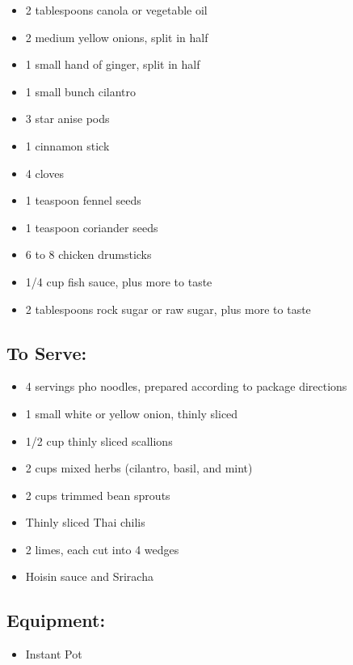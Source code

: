 \documentclass[
]{article}
\providecommand{\tightlist}{%
  \setlength{\itemsep}{0pt}\setlength{\parskip}{0pt}}
\begin{document}
\begin{itemize}
\tightlist
\item
  2 tablespoons canola or vegetable oil
\item
  2 medium yellow onions, split in half
\item
  1 small hand of ginger, split in half
\item
  1 small bunch cilantro
\item
  3 star anise pods
\item
  1 cinnamon stick
\item
  4 cloves
\item
  1 teaspoon fennel seeds
\item
  1 teaspoon coriander seeds
\item
  6 to 8 chicken drumsticks
\item
  1/4 cup fish sauce, plus more to taste
\item
  2 tablespoons rock sugar or raw sugar, plus more to taste
\end{itemize}

\hypertarget{to-serve}{%
\subsection{To Serve:}\label{to-serve}}

\begin{itemize}
\tightlist
\item
  4 servings pho noodles, prepared according to package directions
\item
  1 small white or yellow onion, thinly sliced
\item
  1/2 cup thinly sliced scallions
\item
  2 cups mixed herbs (cilantro, basil, and mint)
\item
  2 cups trimmed bean sprouts
\item
  Thinly sliced Thai chilis
\item
  2 limes, each cut into 4 wedges
\item
  Hoisin sauce and Sriracha
\end{itemize}

\hypertarget{equipment}{%
\subsection{Equipment:}\label{equipment}}

\begin{itemize}
\tightlist
\item
  Instant Pot
\end{itemize}
\end{document}
